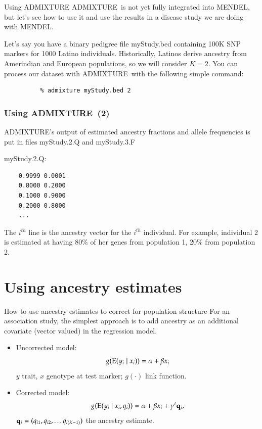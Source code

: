 \documentclass[serif,professionalfonts,svgnames]{beamer}
\newcommand{\admixture}{\textsc{ADMIXTURE}}
\def\E{\mathop{\rm E\,\!}\nolimits}
\begin{document}
\begin{frame}[containsverbatim]{Using \admixture}
  \admixture\ is not yet fully integrated into MENDEL, but let's see
  how to use it and use the results in a disease study we are doing
  with MENDEL.
  
  Let's say you have a binary pedigree file {\sf myStudy.bed}
  containing 100K SNP markers for 1000 Latino individuals.
  Historically, Latinos derive ancestry from Amerindian and European
  populations, so we will consider $K=2$. You can process our dataset
  with \admixture\ with the following simple command:
  
\begin{verbatim}
          % admixture myStudy.bed 2
\end{verbatim}

\end{frame}



\begin{frame}[fragile]
  \frametitle{Using \admixture\ (2)}
  \admixture's output of estimated ancestry fractions and allele frequencies is put in files {\sf myStudy.2.Q} and {\sf myStudy.3.F}
  
{\sf myStudy.2.Q}:
\begin{center}
\begin{minipage}{2in}
  \begin{lstlisting}
    0.9999 0.0001
    0.8000 0.2000
    0.1000 0.9000
    0.2000 0.8000
    ...
  \end{lstlisting}
\end{minipage}
\end{center}
  The $i^{th}$ line is the ancestry vector for the $i^{th}$ individual.  For example, individual 2 is estimated at having 80\% of her genes from population 1, 20\% from population 2.
  
\end{frame}


\section{Using ancestry estimates}

\begin{frame}{How to use ancestry estimates to correct for population structure}
  For an association study, the simplest approach is to add ancestry as an additional covariate (vector valued) in the regression model.  
  \begin{itemize}
    \item Uncorrected model: $$g(\E(y_i \mid x_i)) = \alpha + \beta x_i$$  
    $y$ trait, $x$ genotype at test marker; $g(\cdot)$ link function.
    \item Corrected model:  
      $$g(\E(y_i \mid x_i, q_i)) = \alpha + \beta x_i + \gamma^t {\bf q}_i,$$
      ${\bf q}_i=(q_{i1}, q_{i2}, \ldots q_{i(K-1)})$ the ancestry estimate.
  \end{itemize}
\end{frame}
\end{document}
